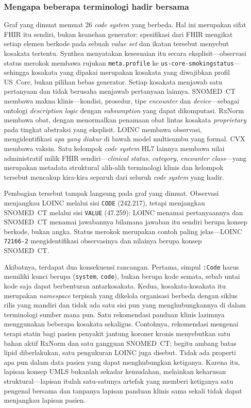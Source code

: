 \subsubsection*{Mengapa beberapa terminologi hadir bersama}
\label{sec:multi-vocab}
Graf yang dimuat memuat 26 \emph{code system} yang berbeda. Hal ini merupakan
sifat FHIR itu sendiri, bukan keanehan generator: spesifikasi dari FHIR mengikat setiap elemen berkode
pada sebuah \emph{value set} dan ikatan tersebut menyebut kosakata tertentu. Synthea
menyatakan kesesuaian itu secara eksplisit---observasi status merokok membawa rujukan
\texttt{meta.profile} ke \texttt{us-core-smokingstatus}---sehingga kosakata yang dipakai
merupakan kosakata yang diwajibkan profil US~Core, bukan pilihan bebas generator. Setiap
kosakata menjawab satu pertanyaan dan tidak berusaha menjawab pertanyaan lainnya. SNOMED~CT
\cite{snomedct} membawa makna klinis---kondisi, prosedur, tipe \emph{encounter} dan
\emph{device}---sebagai ontologi \emph{description logic} dengan \emph{subsumption} yang dapat
dikomputasi. RxNorm \cite{rxnorm} membawa obat, dengan menormalkan penamaan obat lintas
kosakata \emph{proprietary} pada tingkat abstraksi yang eksplisit. LOINC \cite{loinc} membawa
observasi, mengidentifikasi \emph{apa yang diukur} di bawah model multisumbu yang formal. CVX
membawa vaksin. Satu kelompok \emph{code system} HL7 lainnya membawa nilai administratif milik
FHIR sendiri---\emph{clinical status}, \emph{category}, \emph{encounter class}---yang
merupakan metadata struktural alih-alih terminologi klinis dan kelompok tersebut mencakup
kira-kira separuh dari seluruh \emph{code system} yang hadir.

Pembagian tersebut tampak langsung pada graf yang dimuat. Observasi menjangkau LOINC melalui
sisi \texttt{CODE} (242.217), tetapi menjangkau SNOMED~CT melalui sisi
\texttt{VALUE} (47.259): LOINC menamai pertanyaannya dan SNOMED~CT menamai
jawabannya bilamana jawaban itu sendiri berupa konsep berkode, bukan angka. Status merokok
merupakan contoh paling jelas---LOINC \texttt{72166-2} mengidentifikasi observasinya dan
nilainya berupa konsep SNOMED~CT.

Akibatnya, terdapat dua konsekuensi rancangan. Pertama, simpul
\texttt{:Code} harus memiliki kunci berupa (\texttt{system}, \texttt{code}), bukan berupa kode semata,
sebab untai kode saja dapat berbenturan antarkosakata. Kedua,
kosakata-kosakata itu merupakan \emph{namespace} terpisah yang dikelola organisasi berbeda
dengan siklus rilis yang mandiri dan tidak ada satu sisi pun yang menghubungkannya di dalam
terminologi sumber mana pun. Satu rekomendasi panduan klinis lazimnya menggunakan beberapa kosakata
sekaligus. Contohnya, rekomendasi mengenai terapi statin bagi pasien penyakit jantung koroner kronis menyebutkan satu bahan aktif
RxNorm dan satu gangguan SNOMED~CT; begitu ambang batas lipid diberlakukan, satu pengukuran LOINC juga
disebut. Tidak ada properti apa pun dalam data pasien yang dapat menghubungkan ketiganya. Karena itu, lapisan
konsep UMLS bukanlah sekadar kemudahan, melainkan keharusan struktural---lapisan itulah satu-satunya
artefak yang memberi ketiganya satu pengenal bersama dan tanpanya lapisan panduan klinis sama sekali
tidak dapat menjangkau lapisan pasien.

